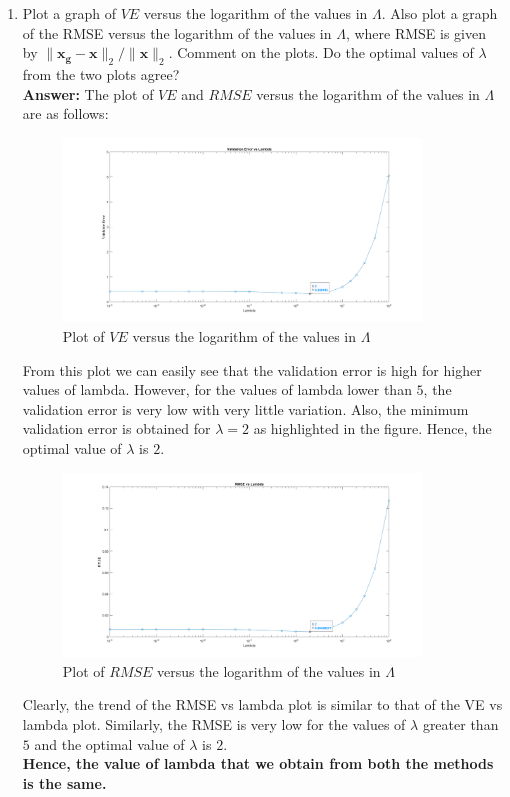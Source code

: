 \documentclass[12pt]{article}
\begin{document}
\begin{itemize}
\begin{enumerate}
\item Plot a graph of $VE$ versus the logarithm of the values in $\Lambda$.  Also plot a graph of the RMSE versus the logarithm of the values in $\Lambda$, where RMSE is given by $\|\boldsymbol{x_g} - \boldsymbol{x}\|_2 / \|\boldsymbol{x}\|_2$. Comment on the plots. Do the optimal values of $\lambda$ from the two plots agree? \\
\textbf{Answer:} The plot of $VE$ and $RMSE$ versus the logarithm of the values in $\Lambda$ are as follows:
\begin{figure}[H]
\centering
\includegraphics[width=0.9\textwidth]{Images/Q1_VE_vs_lambda.png}
\caption{Plot of $VE$ versus the logarithm of the values in $\Lambda$}
\label{fig:Q1_VE_vs_lambda_1}
\end{figure}

From this plot we can easily see that the validation error is high for higher values of lambda. However, for the values of lambda lower than $5$, the validation error is very low with very little variation. Also, the minimum validation error is obtained for $\lambda = 2$ as highlighted in the figure. Hence, the optimal value of $\lambda$ is $2$.

\begin{figure}[H]
\centering
\includegraphics[width=0.9\textwidth]{Images/Q1_RMSE_vs_lambda.png}
\caption{Plot of $RMSE$ versus the logarithm of the values in $\Lambda$}
\label{fig:Q1_RMSE_vs_lambda_1}
\end{figure}
Clearly, the trend of the RMSE vs lambda plot is similar to that of the VE vs lambda plot. Similarly, the RMSE is very low for the values of $\lambda$ greater than $5$ and the optimal value of $\lambda$ is $2$.\\
\textbf{Hence, the value of lambda that we obtain from both the methods is the same.} \\


\end{enumerate}
\end{itemize}
\end{document}
